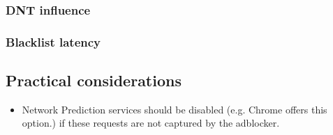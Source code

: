 \documentclass{sig-alternate}
\begin{document}
%

\subsubsection{DNT influence}

\subsubsection{Blacklist latency}

\subsection{Practical considerations}
\begin{itemize}
	\item Network Prediction services should be disabled (e.g. Chrome offers this option.) if these requests are not captured by the adblocker.
\end{itemize}
\end{document}
